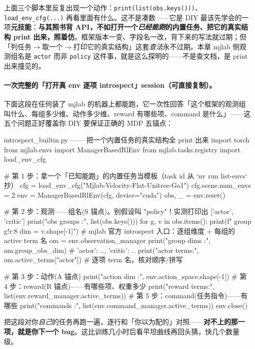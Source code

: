 上面三个脚本里反复出现一个动作：\verb|print(list(obs.keys()))|、\verb|load_env_cfg(...)| 再看里面有什么。这不是凑数——它是 DIY 最该先学会的一项\textbf{元技能}：\textbf{与其照书背 API，不如打开一个\emph{已经能跑}的内置任务、把它的真实结构 print 出来，照着仿}。框架版本一变、字段名一改，背下来的写法就过期；但「列任务$\to$取一个$\to$打印它的真实结构」这套\emph{查法}永不过期。本章 mjlab 侧观测组名是 \verb|actor| 而非 \verb|policy| 这件事，就是这么探明的——不是查文档，是 print 出来撞见的。

\paragraph{一次完整的「打开真 env 逐项 introspect」session（可直接复制）。}下面这段在任何装了 mjlab 的机器上都能跑，它一次性回答「这个框架的观测组叫什么、每组多少维、动作多少维、reward 有哪些项、command 是什么」——这五个问题正好覆盖你 DIY 要保证正确的 MDP 五锚点：

\begin{codebox}[Python]{introspect\_builtin.py —— 把一个内置任务的真实结构全 print 出来}
import torch
from mjlab.envs import ManagerBasedRlEnv
from mjlab.tasks.registry import load_env_cfg

# 第 1 步：拿一个「已知能跑」的内置任务当模板（task id 从 `uv run list-envs` 抄）
cfg = load_env_cfg("Mjlab-Velocity-Flat-Unitree-Go1")
cfg.scene.num_envs = 2
env = ManagerBasedRlEnv(cfg, device="cuda")
obs, _ = env.reset()

# 第 2 步：观测——组名(S 锚点)。别假设叫 "policy"！实测打印出 ['actor', 'critic']
print("obs groups :", list(obs.keys()))
for g, v in obs.items():
    print(f"  group {g!r:8} dim = {v.shape[-1]}")
# mjlab 官方 introspect 入口：逐组维度 + 每组的 active term 名
om = env.observation_manager
print("group dims :", om.group_obs_dim)          # {'actor': .., 'critic': ..}
print("actor terms:", om.active_terms["actor"])  # 逐项 term 名，核对顺序/拼写

# 第 3 步：动作(A 锚点)
print("action dim :", env.action_space.shape[-1])
# 第 4 步：reward(R 锚点)——有哪些项、权重多少
print("reward terms:", list(env.reward_manager.active_terms))
# 第 5 步：command(任务指令)——有哪些
print("commands   :", list(env.command_manager.active_terms))
env.close()
\end{codebox}

把这段对你\emph{自己}的任务再跑一遍，逐行和「你以为配的」对照——\textbf{对不上的那一项，就是你下一个 bug}。这比训练几小时后看平坦曲线再回头猜，快几个数量级。

